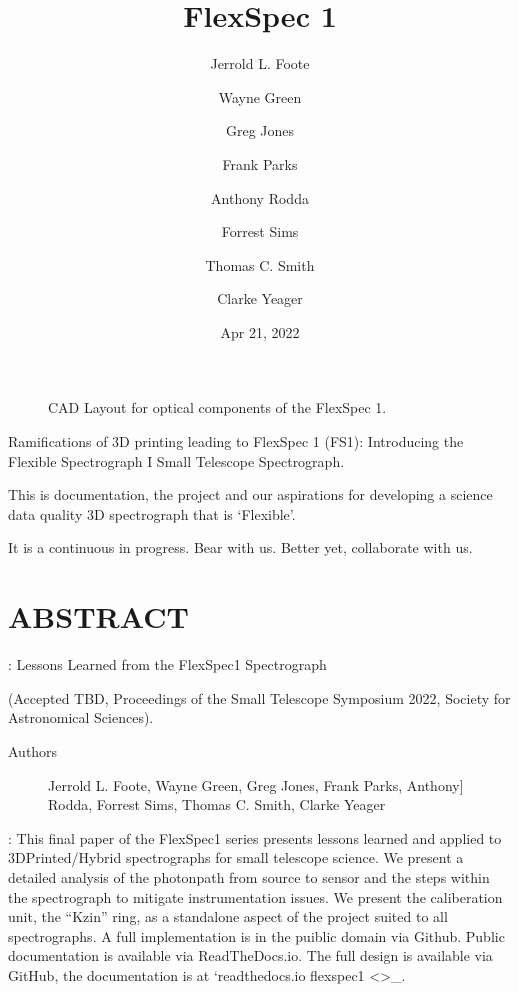 \documentclass[letterpaper,10pt,english,openany,oneside]{sphinxmanual}
\title{FlexSpec 1}
\date{Apr 21, 2022}
\author{Jerrold L. Foote\and Wayne Green\and Greg Jones\and Frank Parks\and Anthony Rodda\and Forrest Sims\and Thomas C. Smith\and Clarke Yeager}
\begin{document}
\pagestyle{empty}
\sphinxmaketitle
\pagestyle{plain}
\sphinxtableofcontents
\pagestyle{normal}
\label{\detokenize{index::doc}}


\begin{figure}[htbp]
\centering
\capstart

\noindent{}
\caption{CAD Layout for optical components of the FlexSpec 1.}\label{\detokenize{index:id1}}\end{figure}

\sphinxAtStartPar
Ramifications of 3D printing leading to FlexSpec 1 (FS1):
Introducing the Flexible Spectrograph I
Small Telescope Spectrograph.

\sphinxAtStartPar
This is documentation, the project and our aspirations for developing
a science data quality 3D spectrograph that is ‘Flexible’.

\sphinxAtStartPar
It is a continuous in progress. Bear with us. Better yet, collaborate with us.


\chapter{ABSTRACT}
\label{\detokenize{abstract:abstract}}\label{\detokenize{abstract::doc}}
\sphinxAtStartPar
{}:  Lessons Learned from the FlexSpec1 Spectrograph

\sphinxAtStartPar
(Accepted TBD, Proceedings of the Small Telescope Symposium 2022, Society
for Astronomical Sciences).
\begin{description}
\item[{Authors}] \leavevmode{[}Jerrold L. Foote, Wayne Green, Greg Jones, Frank Parks, Anthony{]}
\sphinxAtStartPar
Rodda, Forrest Sims, Thomas C. Smith, Clarke Yeager

\end{description}

\sphinxAtStartPar
{}:
This final paper of the FlexSpec1 series presents lessons learned and applied to 3D\sphinxhyphen{}Printed/Hybrid spectrographs for small telescope science. We present a detailed analysis of the photon\sphinxhyphen{}path from source to sensor and the steps within the spectrograph to mitigate instrumentation issues.  We present the caliberation unit, the “Kzin” ring, as a stand\sphinxhyphen{}alone aspect of the project suited to all spectrographs. A full implementation is in the puiblic domain via Github. Public documentation is available via ReadTheDocs.io. The full design is available via GitHub, the documentation is at ‘readthedocs.io flexspec1 \textless{}\textgreater{}\_.
\end{document}
